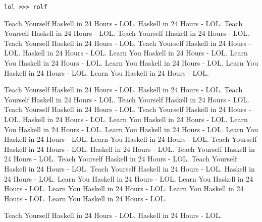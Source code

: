 \begin{verbatim}
lol >>> rolf
\end{verbatim}

Teach Yourself Haskell in 24 Hours - LOL.  Haskell in 24 Hours - LOL. Teach Yourself Haskell in 24 Hours - LOL. Teach Yourself Haskell in 24 Hours - LOL. Teach Yourself Haskell in 24 Hours - LOL. Teach Yourself Haskell in 24 Hours - LOL.  Haskell in 24 Hours - LOL. Learn You Haskell in 24 Hours - LOL. Learn You Haskell in 24 Hours - LOL. Learn You Haskell in 24 Hours - LOL. Learn You Haskell in 24 Hours - LOL. Learn You Haskell in 24 Hours - LOL.

Teach Yourself Haskell in 24 Hours - LOL.  Haskell in 24 Hours - LOL. Teach Yourself Haskell in 24 Hours - LOL. Teach Yourself Haskell in 24 Hours - LOL. Teach Yourself Haskell in 24 Hours - LOL. Teach Yourself Haskell in 24 Hours - LOL.  Haskell in 24 Hours - LOL. Learn You Haskell in 24 Hours - LOL. Learn You Haskell in 24 Hours - LOL. Learn You Haskell in 24 Hours - LOL. Learn You Haskell in 24 Hours - LOL. Learn You Haskell in 24 Hours - LOL.
Teach Yourself Haskell in 24 Hours - LOL.  Haskell in 24 Hours - LOL. Teach Yourself Haskell in 24 Hours - LOL. Teach Yourself Haskell in 24 Hours - LOL. Teach Yourself Haskell in 24 Hours - LOL. Teach Yourself Haskell in 24 Hours - LOL.  Haskell in 24 Hours - LOL. Learn You Haskell in 24 Hours - LOL. Learn You Haskell in 24 Hours - LOL. Learn You Haskell in 24 Hours - LOL. Learn You Haskell in 24 Hours - LOL. Learn You Haskell in 24 Hours - LOL.

Teach Yourself Haskell in 24 Hours - LOL.  Haskell in 24 Hours - LOL.
